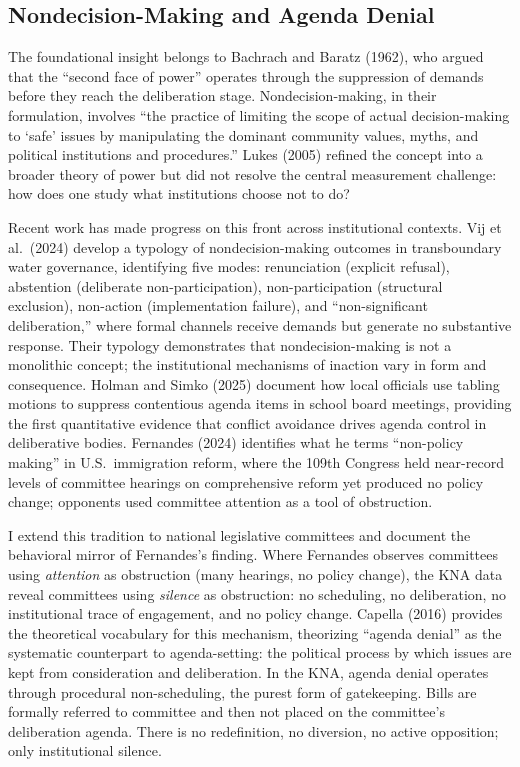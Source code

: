 \documentclass[11pt]{article}
\begin{document}
\subsection{Nondecision-Making and Agenda Denial}

The foundational insight belongs to Bachrach and Baratz (1962), who argued that the ``second face of power'' operates through the suppression of demands before they reach the deliberation stage. Nondecision-making, in their formulation, involves ``the practice of limiting the scope of actual decision-making to `safe' issues by manipulating the dominant community values, myths, and political institutions and procedures.'' Lukes (2005) refined the concept into a broader theory of power but did not resolve the central measurement challenge: how does one study what institutions choose not to do?

Recent work has made progress on this front across institutional contexts. Vij et al.\ (2024) develop a typology of nondecision-making outcomes in transboundary water governance, identifying five modes: renunciation (explicit refusal), abstention (deliberate non-participation), non-participation (structural exclusion), non-action (implementation failure), and ``non-significant deliberation,'' where formal channels receive demands but generate no substantive response. Their typology demonstrates that nondecision-making is not a monolithic concept; the institutional mechanisms of inaction vary in form and consequence. Holman and Simko (2025) document how local officials use tabling motions to suppress contentious agenda items in school board meetings, providing the first quantitative evidence that conflict avoidance drives agenda control in deliberative bodies. Fernandes (2024) identifies what he terms ``non-policy making'' in U.S.\ immigration reform, where the 109th Congress held near-record levels of committee hearings on comprehensive reform yet produced no policy change; opponents used committee attention as a tool of obstruction.

I extend this tradition to national legislative committees and document the behavioral mirror of Fernandes's finding. Where Fernandes observes committees using \textit{attention} as obstruction (many hearings, no policy change), the KNA data reveal committees using \textit{silence} as obstruction: no scheduling, no deliberation, no institutional trace of engagement, and no policy change. Capella (2016) provides the theoretical vocabulary for this mechanism, theorizing ``agenda denial'' as the systematic counterpart to agenda-setting: the political process by which issues are kept from consideration and deliberation. In the KNA, agenda denial operates through procedural non-scheduling, the purest form of gatekeeping. Bills are formally referred to committee and then not placed on the committee's deliberation agenda. There is no redefinition, no diversion, no active opposition; only institutional silence.
\end{document}
